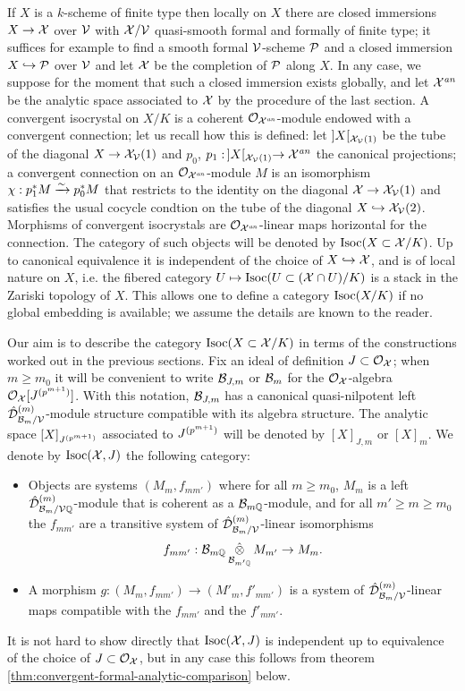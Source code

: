 \documentclass{article}
\theoremstyle{change}
\numberwithin{equation}{subsubsection}
\begin{document}
If $X$ is a $k$-scheme of finite type then locally on $X$ there are
closed immersions $X\to{\cal X}$ over ${\cal V}$ with ${\cal X}/{\cal V}$ quasi-smooth
formal and formally of finite type; it suffices for example to find a
smooth formal ${\cal V}$-scheme ${\cal P}$ and a closed immersion $X\hookrightarrow{\cal P}$ over
${\cal V}$ and let ${\cal X}$ be the completion of ${\cal P}$ along $X$.  In any case,
we suppose for the moment that such a closed immersion exists
globally, and let ${\cal X}^{\mathit{an}}$ be the analytic space associated to ${\cal X}$
by the procedure of the last section. A convergent isocrystal on $X/K$
is a coherent ${\cal O}_{{\cal X}^{\mathit{an}}}$-module endowed with a convergent
connection; let us recall how this is defined: let $]X[_{{\cal X}_{\cal V}(1)}$
be the tube of the diagonal $X\to{\cal X}_{\cal V}(1)$ and $p_0$,
$p_1:\,]X[_{{\cal X}_{\cal V}(1)}\to{\cal X}^{\mathit{an}}$ the canonical projections; a
convergent connection on an ${\cal O}_{{\cal X}^{\mathit{an}}}$-module $M$ is an
isomorphism $\chi:p_1^*M\xrightarrow{\sim} p_0^*M$ that restricts to the identity
on the diagonal ${\cal X}\to{\cal X}_{\cal V}(1)$ and satisfies the usual cocycle
condtion on the tube of the diagonal $X\hookrightarrow{\cal X}_{\cal V}(2)$. Morphisms of
convergent isocrystals are ${\cal O}_{{\cal X}^{\mathit{an}}}$-linear maps horizontal for
the connection. The category of such objects will be denoted by
$\mathrm{Isoc}(X\subset{\cal X}/K)$. Up to canonical equivalence it is independent
of the choice of $X\hookrightarrow{\cal X}$, and is of local nature on $X$, i.e. the
fibered category $U\mapsto\mathrm{Isoc}(U\subset({\cal X}\cap U)/K)$ is a stack in
the Zariski topology of $X$. This allows one to define a category
$\mathrm{Isoc}(X/K)$ if no global embedding is available; we assume the
details are known to the reader.

Our aim is to describe the category $\mathrm{Isoc}(X\subset{\cal X}/K)$ in terms of
the constructions worked out in the previous sections. Fix an ideal of
definition $J\subset{\cal O}_{\cal X}$; when $m\ge m_0$ it will be convenient to
write ${\cal B}_{J,m}$ or ${\cal B}_m$ for the ${\cal O}_{\cal X}$-algebra
${\cal O}_{\cal X}[{J}^{({p^{m+1}})}]$. With this notation, ${\cal B}_{J,m}$ has a
canonical quasi-nilpotent left ${\hat{\cal D}}^{({m})}_{{\cal B}_m/{\cal V}}$-module
structure compatible with its algebra structure. The analytic space
$[X]_{{J}^{({p^{m+1}})}}$ associated to ${J}^{({p^{m+1}})}$ will be
denoted by $[X]_{J,m}$ or $[X]_m$. We denote by $\mathrm{Isoc}({\cal X},J)$ the
following category:
\begin{itemize}
\item Objects are systems $(M_m,f_{mm'})$ where for all $m\ge m_0$,
  $M_m$ is a left ${\hat{\cal D}}^{({m})}_{{\cal B}_m/{\cal V}{\mathbb Q}}$-module that is coherent
  as a ${\cal B}_{m{\mathbb Q}}$-module, and for all $m'\ge m\ge m_0$ the $f_{mm'}$
  are a transitive system of ${\hat{\cal D}}^{({m})}_{{\cal B}_m/{\cal V}}$-linear
  isomorphisms
  \begin{equation}
    \label{eq:Isoc(X,J)}
    f_{mm'}:{\cal B}_{m{\mathbb Q}}\mathop{\hat\otimes}_{{\cal B}_{m'{\mathbb Q}}}M_{m'}\to M_m.
  \end{equation}
\item A morphism $g:(M_m,f_{mm'})\to(M'_m,f'_{mm'})$ is a system of
  ${\hat{\cal D}}^{({m})}_{{\cal B}_m/{\cal V}}$-linear maps compatible with the $f_{mm'}$
  and the $f'_{mm'}$.
\end{itemize}
It is not hard to show directly that $\mathrm{Isoc}({\cal X},J)$ is independent up
to equivalence of the choice of $J\subset{\cal O}_{\cal X}$, but in any case this
follows from theorem \ref{thm:convergent-formal-analytic-comparison}
below.
\end{document}
